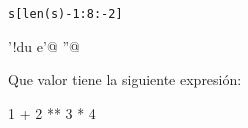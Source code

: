 \begin{ejercicio}
\begin{Verbatim}
s[len(s)-1:8:-2]
\end{Verbatim}

\begin{choices}
    \choice \verb@'!du e'@
    \choice \verb@''@
    \choice \verb@TypeError@
    \choice \verb@IndexError@
\end{choices}
\end{ejercicio}

\begin{ejercicio}Que valor tiene la siguiente expresión:

1 + 2 ** 3 * 4

\begin{choices}
\end{choices}
\end{ejercicio}

